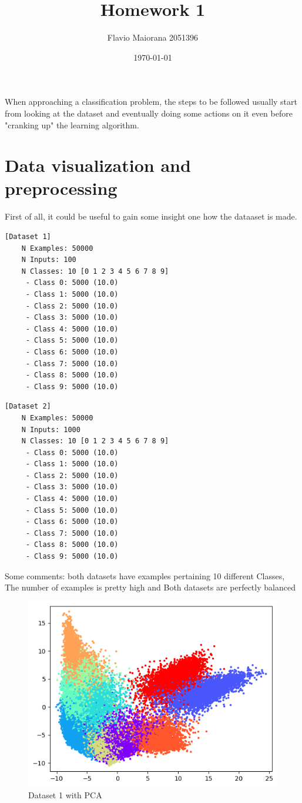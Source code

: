 \documentclass[12pt,a4paper,oneside]{article}
\title{Homework 1}	                                    %
\author{Flavio Maiorana 2051396}				                %
\date{\today}								    %
\begin{document}

\newpage

When approaching a classification problem, the steps to be followed
usually start from looking at the dataset and eventually doing some actions on
it even before "cranking up" the learning algorithm.

\section{Data visualization and preprocessing}

First of all, it could be useful to gain some insight one how the dataaset is
made.

\begin{verbatim}[Dataset 1]
    N Examples: 50000
    N Inputs: 100
    N Classes: 10 [0 1 2 3 4 5 6 7 8 9]
     - Class 0: 5000 (10.0)
     - Class 1: 5000 (10.0)
     - Class 2: 5000 (10.0)
     - Class 3: 5000 (10.0)
     - Class 4: 5000 (10.0)
     - Class 5: 5000 (10.0)
     - Class 6: 5000 (10.0)
     - Class 7: 5000 (10.0)
     - Class 8: 5000 (10.0)
     - Class 9: 5000 (10.0)
\end{verbatim}

\begin{verbatim}[Dataset 2]
    N Examples: 50000
    N Inputs: 1000
    N Classes: 10 [0 1 2 3 4 5 6 7 8 9]
     - Class 0: 5000 (10.0)
     - Class 1: 5000 (10.0)
     - Class 2: 5000 (10.0)
     - Class 3: 5000 (10.0)
     - Class 4: 5000 (10.0)
     - Class 5: 5000 (10.0)
     - Class 6: 5000 (10.0)
     - Class 7: 5000 (10.0)
     - Class 8: 5000 (10.0)
     - Class 9: 5000 (10.0)
\end{verbatim}

Some comments: both datasets have examples pertaining 10 different Classes, The
number of examples is pretty high and Both datasets are perfectly balanced

\begin{figure}[H]
    \includegraphics{figures/dataset1.png}
    \caption{Dataset 1 with PCA}
\end{figure}
\end{document}
